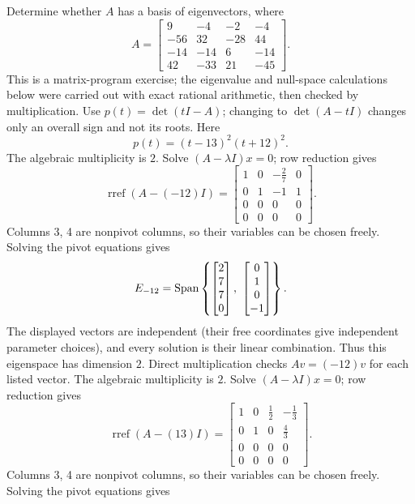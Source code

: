 \goal Determine whether $A$ has a basis of eigenvectors, where
\[A=\begin{bmatrix}9&-4&-2&-4\\-56&32&-28&44\\-14&-14&6&-14\\42&-33&21&-45\end{bmatrix}.\]
This is a matrix-program exercise; the eigenvalue and null-space calculations below were carried out with exact rational arithmetic, then checked by multiplication.
Use $p(t)=\det(tI-A)$; changing to $\det(A-tI)$ changes only an overall sign and not its roots. Here
\[p(t)=\left(t - 13\right)^{2} \left(t + 12\right)^{2}.\]
The algebraic multiplicity is $2$. Solve $(A-\lambda I)x=0$; row reduction gives
\[\operatorname{rref}(A-(-12)I)=\begin{bmatrix}1&0&- \frac{2}{7}&0\\0&1&-1&1\\0&0&0&0\\0&0&0&0\end{bmatrix}.\]
Columns 3, 4 are nonpivot columns, so their variables can be chosen freely. Solving the pivot equations gives
\[E_{-12}=\Span\left\{\begin{bmatrix}2\\7\\7\\0\end{bmatrix},\ \begin{bmatrix}0\\1\\0\\-1\end{bmatrix}\right\}.\]
The displayed vectors are independent (their free coordinates give independent parameter choices), and every solution is their linear combination. Thus this eigenspace has dimension $2$. Direct multiplication checks $Av=(-12)v$ for each listed vector.
The algebraic multiplicity is $2$. Solve $(A-\lambda I)x=0$; row reduction gives
\[\operatorname{rref}(A-(13)I)=\begin{bmatrix}1&0&\frac{1}{2}&- \frac{1}{3}\\0&1&0&\frac{4}{3}\\0&0&0&0\\0&0&0&0\end{bmatrix}.\]
Columns 3, 4 are nonpivot columns, so their variables can be chosen freely. Solving the pivot equations gives
